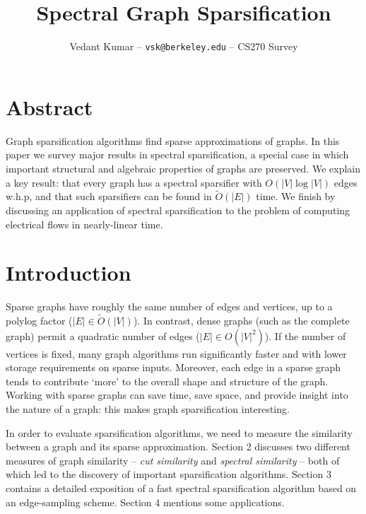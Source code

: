 \documentclass{article}
\title{Spectral Graph Sparsification}
\author{\small{Vedant Kumar -- \texttt{vsk@berkeley.edu} -- CS270 Survey}}
\begin{document}
\maketitle

\newcommand \R{\mathbb{R}}
\newcommand \one{\mathbf{1}}
\newcommand \zero{\mathbf{0}}
\newcommand \Tr{\text{Tr}}
\newcommand \im{\text{im}}
\newcommand \Span{\text{span}}
\newcommand \cut[1]{\text{cut}_{#1}}
\newcommand \textlcsc[1]{\textsc{\MakeLowercase{#1}}}

\section*{Abstract}

Graph sparsification algorithms find sparse approximations of graphs. In
this paper we survey major results in spectral sparsification, a special
case in which important structural and algebraic properties of graphs are
preserved. We explain a key result: that every graph has a spectral
sparsifier with $O(|V|\log|V|)$ edges w.h.p, and that such sparsifiers can
be found in $\tilde{O}(|E|)$ time. We finish by discussing an application of
spectral sparsification to the problem of computing electrical flows in
nearly-linear time.

\section{Introduction}

Sparse graphs have roughly the same number of edges and vertices, up to a
polylog factor ($|E| \in \tilde{O}(|V|)$). In contrast, dense graphs (such
as the complete graph) permit a quadratic number of edges ($|E| \in
O(|V|^2)$). If the number of vertices is fixed, many graph algorithms run
significantly faster and with lower storage requirements on sparse inputs.
Moreover, each edge in a sparse graph tends to contribute `more' to the
overall shape and structure of the graph.  Working with sparse graphs can
save time, save space, and provide insight into the nature of a graph: this
makes graph sparsification interesting.

In order to evaluate sparsification algorithms, we need to measure the
similarity between a graph and its sparse approximation. Section 2 discusses
two different measures of graph similarity -- \textit{cut similarity} and
\textit{spectral similarity} -- both of which led to the discovery of
important sparsification algorithms. Section 3 contains a detailed
exposition of a fast spectral sparsification algorithm based on an
edge-sampling scheme. Section 4 mentions some applications.
\end{document}
